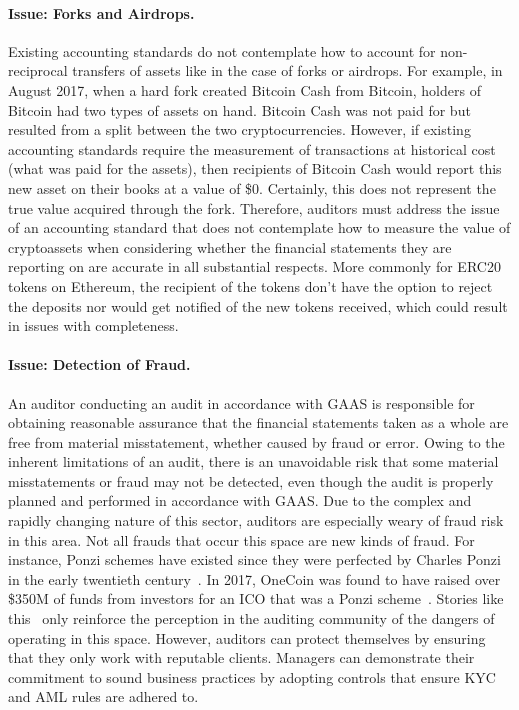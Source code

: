 \paragraph{Issue: Forks and Airdrops.} Existing accounting standards do not contemplate how to account for non-reciprocal transfers of assets like in the case of forks or airdrops. For example, in August 2017, when a hard fork created Bitcoin Cash from Bitcoin, holders of Bitcoin had two types of assets on hand. Bitcoin Cash was not paid for but resulted from a split between the two cryptocurrencies. However, if existing accounting standards require the measurement of transactions at historical cost (what was paid for the assets), then recipients of Bitcoin Cash would report this new asset on their books at a value of \$0. Certainly, this does not represent the true value acquired through the fork. Therefore, auditors must address the issue of an accounting standard that does not contemplate how to measure the value of cryptoassets when considering whether the financial statements they are reporting on are accurate in all substantial respects. More commonly for ERC20 tokens on Ethereum, the recipient of the tokens don{'}t have the option to reject the deposits nor would get notified of the new tokens received, which could result in issues with completeness. 

\paragraph{Issue: Detection of Fraud.} An auditor conducting an audit in accordance with GAAS is responsible for obtaining reasonable assurance that the financial statements taken as a whole are free from material misstatement, whether caused by fraud or error. Owing to the inherent limitations of an audit, there is an unavoidable risk that some material misstatements or fraud may not be detected, even though the audit is properly planned and performed in accordance with GAAS. Due to the complex and rapidly changing nature of this sector, auditors are especially weary of fraud risk in this area. 
Not all frauds that occur this space are new kinds of fraud. For instance, Ponzi schemes have existed since they were perfected by Charles Ponzi in the early twentieth century~\cite{ponzi2001rise}. In 2017, OneCoin was found to have raised over \$350M of funds from investors for an ICO that was a Ponzi scheme~\cite{atlanticCryptoPonzi2017}. Stories like this~\cite{vasek2015analyzing} only reinforce the perception in the auditing community of the dangers of operating in this space. However, auditors can protect themselves by ensuring that they only work with reputable clients. Managers can demonstrate their commitment to sound business practices by adopting controls that ensure KYC and AML rules are adhered to.

